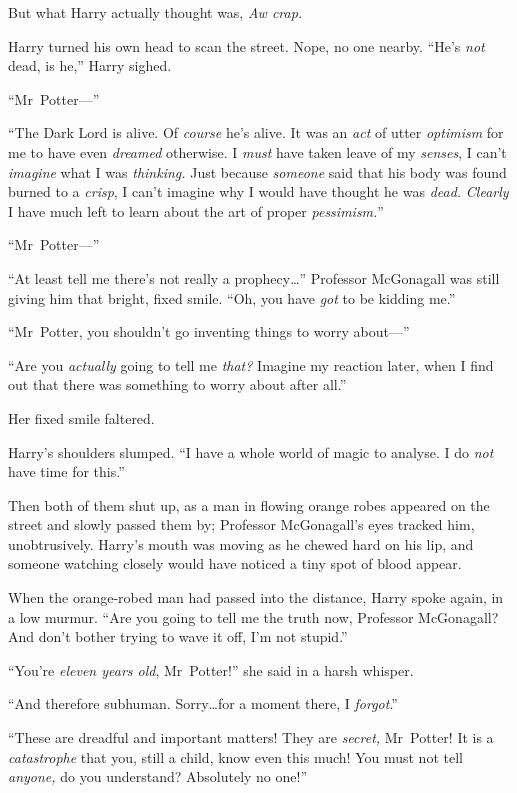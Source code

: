 But what Harry actually thought was, \emph{Aw crap.}

Harry turned his own head to scan the street. Nope, no one nearby. “He’s \emph{not} dead, is he,” Harry sighed.

“Mr~Potter—”

“The Dark Lord is alive. Of \emph{course} he’s alive. It was an \emph{act} of utter \emph{optimism} for me to have even \emph{dreamed} otherwise. I \emph{must} have taken leave of my \emph{senses}, I can’t \emph{imagine} what I was \emph{thinking.} Just because \emph{someone} said that his body was found burned to a \emph{crisp}, I can’t imagine why I would have thought he was \emph{dead.} \emph{Clearly} I have much left to learn about the art of proper \emph{pessimism.}”

“Mr~Potter—”

“At least tell me there’s not really a prophecy…” Professor McGonagall was still giving him that bright, fixed smile. “Oh, you have \emph{got} to be kidding me.”

“Mr~Potter, you shouldn’t go inventing things to worry about—”

“Are you \emph{actually} going to tell me \emph{that?} Imagine my reaction later, when I find out that there was something to worry about after all.”

Her fixed smile faltered.

Harry’s shoulders slumped. “I have a whole world of magic to analyse. I do \emph{not} have time for this.”

Then both of them shut up, as a man in flowing orange robes appeared on the street and slowly passed them by; Professor McGonagall’s eyes tracked him, unobtrusively. Harry’s mouth was moving as he chewed hard on his lip, and someone watching closely would have noticed a tiny spot of blood appear.

When the orange-robed man had passed into the distance, Harry spoke again, in a low murmur. “Are you going to tell me the truth now, Professor McGonagall? And don’t bother trying to wave it off, I’m not stupid.”

“You’re \emph{eleven years old}, Mr~Potter!” she said in a harsh whisper.

“And therefore subhuman. Sorry…for a moment there, I \emph{forgot}.”

“These are dreadful and important matters! They are \emph{secret,} Mr~Potter! It is a \emph{catastrophe} that you, still a child, know even this much! You must not tell \emph{anyone,} do you understand? Absolutely no one!”

